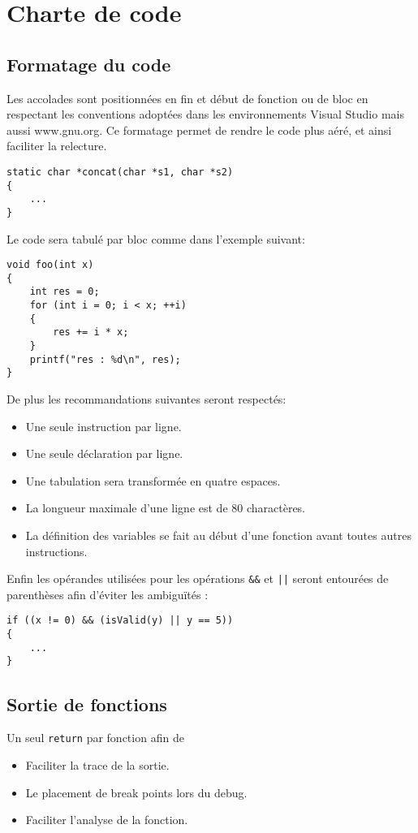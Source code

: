\section{Charte de code}

\subsection{Formatage du code}
Les accolades sont positionnées en fin et début de fonction ou de bloc en 
respectant les conventions adoptées dans les environnements Visual Studio 
mais aussi www.gnu.org. Ce formatage permet de rendre le code plus aéré, 
et ainsi faciliter la relecture.

\begin{verbatim}
static char *concat(char *s1, char *s2)
{
    ...
}
\end{verbatim}

Le code sera tabulé par bloc comme dans l'exemple suivant:
\begin{verbatim}
void foo(int x)
{
    int res = 0;
    for (int i = 0; i < x; ++i)
    {
        res += i * x;
    }
    printf("res : %d\n", res);
}
\end{verbatim}

De plus les recommandations suivantes seront respectés:
\begin{itemize}
	\item Une seule instruction par ligne.
	\item Une seule déclaration par ligne.
	\item Une tabulation sera transformée en quatre espaces.	
	\item La longueur maximale d'une ligne est de 80 charactères.
    \item La définition des variables se fait au début d'une fonction avant
              toutes autres instructions. 
\end{itemize}

Enfin les opérandes utilisées pour les opérations \texttt{&&} et \texttt{||}
seront entourées de parenthèses afin d'éviter les ambiguïtés :
\begin{verbatim}
if ((x != 0) && (isValid(y) || y == 5))
{
    ...
}
\end{verbatim}

\subsection{Sortie de fonctions}

Un seul \texttt{return} par fonction afin de
\begin{itemize}
	\item Faciliter la trace de la sortie.
	\item Le placement de break points lors du debug.
	\item Faciliter l’analyse de la fonction.
\end{itemize}

